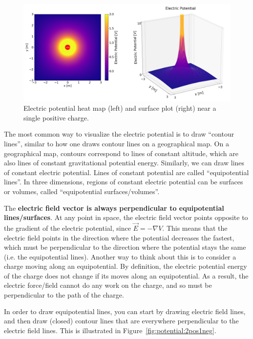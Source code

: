 \begin{figure}[!htbp]
\centering
\includegraphics[width=1\linewidth]{files/1pos-10664d2fe2193f689c1cd55a58c46974.png}
\caption[]{Electric potential heat map (left) and surface plot (right) near a single positive charge.}
\label{fig:potential:1pos}
\end{figure}

The most common way to visualize the electric potential is to draw ``contour lines'', similar to how one draws contour lines on a geographical map. On a geographical map, contours correspond to lines of constant altitude, which are also lines of constant gravitational potential energy. Similarly, we can draw lines of constant electric potential. Lines of constant potential are called ``equipotential lines''. In three dimensions, regions of constant electric potential can be surfaces or volumes, called ``equipotential surfaces/volumes''.

The \textbf{electric field vector is always perpendicular to equipotential lines/surfaces}. At any point in space, the electric field vector points opposite to the gradient of the electric potential, since $\vec E= -\nabla V$. This means that the electric field points in the direction where the potential decreases the fastest, which must be perpendicular to the direction where the potential stays the same (i.e. the equipotential lines). Another way to think about this is to consider a charge moving along an equipotential. By definition, the electric potential energy of the charge does not change if its moves along an equipotential. As a result, the electric force/field cannot do any work on the charge, and so must be perpendicular to the path of the charge.

In order to draw equipotential lines, you can start by drawing electric field lines, and then draw (closed) contour lines that are everywhere perpendicular to the electric field lines. This is illustrated in Figure~\ref{fig:potential:2pos1neg}.

